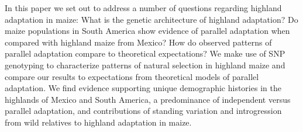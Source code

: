 In this paper we set out to address a number of questions regarding highland adaptation in maize: What is the genetic architecture of highland adaptation? Do maize populations in South America show evidence of parallel adaptation when compared with highland maize from Mexico? How do observed patterns of parallel adaptation compare to theoretical expectations?
We make use of SNP genotyping to characterize patterns of natural selection in highland maize and compare our results to expectations from theoretical models of parallel adaptation.  We find evidence supporting unique demographic histories in the highlands of Mexico and South America, a predominance of independent versus parallel adaptation, and contributions of standing variation and introgression from wild relatives to highland adaptation in maize.
